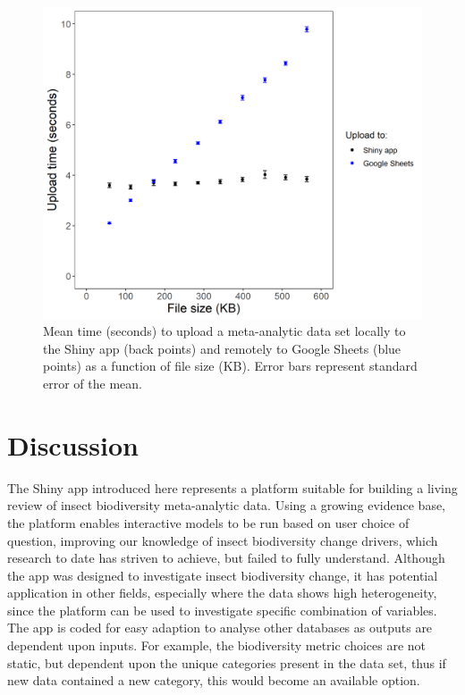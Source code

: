 \documentclass[11pt]{article}
\begin{document}
			\begin{figure}[H] 
				\centering 
				\includegraphics[scale=1]{figure_6_upload_data_time_graph.png} 
				\caption{Mean time (seconds) to upload a meta-analytic data set locally to the Shiny app (back points) and remotely to Google Sheets (blue points) as a function of file size (KB). Error bars represent standard error of the mean.}  
			\end{figure}
			
	\clearpage
	
	\section{Discussion}
		The Shiny app introduced here represents a platform suitable for building a living review of insect biodiversity meta-analytic data. Using a growing evidence base, the platform enables interactive models to be run based on user choice of question, improving our knowledge of insect biodiversity change drivers, which research to date has striven to achieve, but failed to fully understand. Although the app was designed to investigate insect biodiversity change, it has potential application in other fields, especially where the data shows high heterogeneity, since the platform can be used to investigate specific combination of variables. The app is coded for easy adaption to analyse other databases as outputs are dependent upon inputs. For example, the biodiversity metric choices are not static, but dependent upon the unique categories present in the data set, thus if new data contained a new category, this would become an available option.  
		
\end{document}
